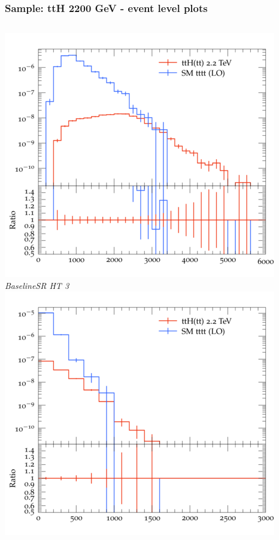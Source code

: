 \documentclass{beamer}
\begin{document}
\begin{frame}
\frametitle{Sample: ttH 2200 GeV - event level plots}
\begin{columns}
\includegraphics[width=\textwidth]{../plots/ttH_2200/tttt_ttH_1LOS/BaselineSR_HT_3.png}\\
\textit{\small BaselineSR HT 3}
\includegraphics[width=\textwidth]{../plots/ttH_2200/tttt_ttH_1LOS/BaselineSR_MET.png}\\

\end{columns}
\end{frame}
\end{document}
